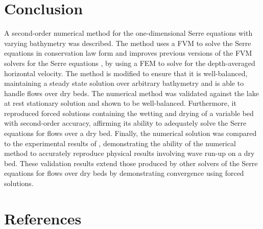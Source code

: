 \documentclass[times]{elsarticle}
\begin{document}
\section{Conclusion}
A second-order numerical method for the one-dimensional Serre equations with varying bathymetry was described. The method uses a FVM to solve the Serre equations in conservation law form and improves previous versions of the FVM solvers for the Serre equations \cite{Zoppou-etal-2017}, by using a FEM to solve for the depth-averaged horizontal velocity. The method is modified to ensure that it is well-balanced, maintaining a steady state solution over arbitrary bathymetry and is able to handle flows over dry beds. The numerical method was validated against the lake at rest stationary solution and shown to be well-balanced. Furthermore, it reproduced forced solutions containing the wetting and drying of a variable bed with second-order accuracy, affirming its ability to adequately solve the Serre equations for flows over a dry bed. Finally, the numerical solution was compared to the experimental results of \citet{Synolakis-1987-523}, demonstrating the ability of the numerical method to accurately reproduce physical results involving wave run-up on a dry bed. These validation results extend those produced by other solvers of the Serre equations for flows over dry beds
\cite{Tissier-2011,Li-2014-169,Filippini-etal-2016-381,DoCarmo-2019-125} by demonstrating convergence using forced solutions.


\section*{References}


\end{document}
